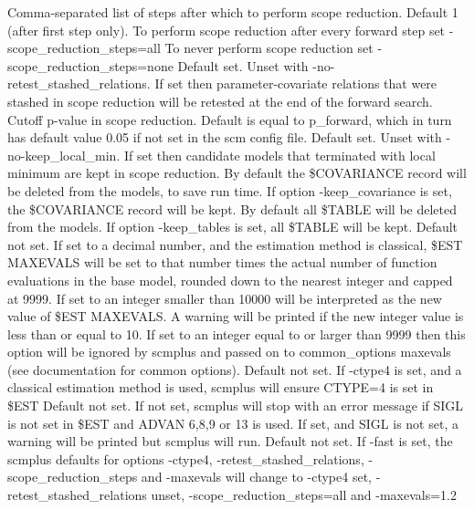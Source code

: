 \documentclass[hideglossary,notoc,hidelof,hidelot,hideTheSignaturePage,hideLinkCurrent,hideloa,pdfLatex,noClient,notitle]{PMXstyle-20170118kajsa4}
\begin{document}
\begin{optionlist}
Comma-separated list of steps after which to perform scope reduction. Default 1 (after first step only).
To perform scope reduction after every forward step set -scope\_reduction\_steps=all 
To never perform scope reduction set -scope\_reduction\_steps=none 
\nextopt
{}
Default set. Unset with -no-retest\_stashed\_relations.
If set then parameter-covariate relations that were stashed
in scope reduction will be retested at the end of the forward search.
\nextopt
{}
Cutoff p-value in scope reduction. Default is equal to p\_forward,
which in turn has default value 0.05 if not set in the scm config file.
\nextopt
{}
Default set. Unset with -no-keep\_local\_min. If set then candidate models that
terminated with local minimum are kept in scope reduction.
By default the \$COVARIANCE record will be deleted from the models, to save run time.
If option -keep\_covariance is set, the \$COVARIANCE record will be kept.
\nextopt
{}
By default all \$TABLE will be deleted from the models.
If option -keep\_tables is set, all \$TABLE will be kept.
\nextopt
{}
Default not set. 
If set to a decimal number, and the estimation method is classical,
\$EST MAXEVALS will be set to that number times 
the actual number of function evaluations in the base model,
rounded down to the nearest integer and capped at 9999. 
If set to an integer smaller than 10000 will be interpreted as the new value
of \$EST MAXEVALS. A warning will be printed if the new integer value is 
less than or equal to 10. 
If set to an integer equal to or larger than 9999 then this option
will be ignored by scmplus and passed on to common\_options maxevals
(see documentation for common options).
Default not set.
If -ctype4 is set, and a classical estimation method is used,
scmplus will ensure CTYPE=4 is set in \$EST
\nextopt
{}
Default not set.
If not set, scmplus will stop with an error message if
SIGL is not set in \$EST and ADVAN 6,8,9 or 13 is used.
If set, and SIGL is not set, a warning will be printed but scmplus will run.
\nextopt
{}
Default not set. 
If -fast is set, the scmplus defaults for options -ctype4, -retest\_stashed\_relations,
-scope\_reduction\_steps and -maxevals will change to -ctype4 set, 
-retest\_stashed\_relations unset, -scope\_reduction\_steps=all and -maxevals=1.2\\ 

\end{optionlist}
\end{document}
